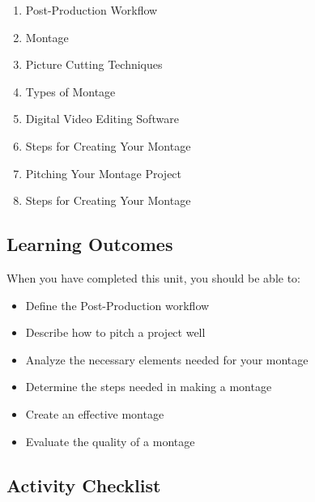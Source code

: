 \documentclass[
]{book}
\providecommand{\tightlist}{%
  \setlength{\itemsep}{0pt}\setlength{\parskip}{0pt}}
\begin{document}
\begin{enumerate}
\def\labelenumi{\arabic{enumi}.}
\tightlist
\item
  Post-Production Workflow\\
\item
  Montage\\
\item
  Picture Cutting Techniques\\
\item
  Types of Montage\\
\item
  Digital Video Editing Software\\
\item
  Steps for Creating Your Montage\\
\item
  Pitching Your Montage Project\\
\item
  Steps for Creating Your Montage
\end{enumerate}

\hypertarget{learning-outcomes-6}{%
\subsection*{Learning Outcomes}\label{learning-outcomes-6}}

When you have completed this unit, you should be able to:

\begin{itemize}
\tightlist
\item
  Define the Post-Production workflow\\
\item
  Describe how to pitch a project well\\
\item
  Analyze the necessary elements needed for your montage\\
\item
  Determine the steps needed in making a montage\\
\item
  Create an effective montage\\
\item
  Evaluate the quality of a montage
\end{itemize}

\hypertarget{activity-checklist-6}{%
\subsection*{Activity Checklist}\label{activity-checklist-6}}
\end{document}
